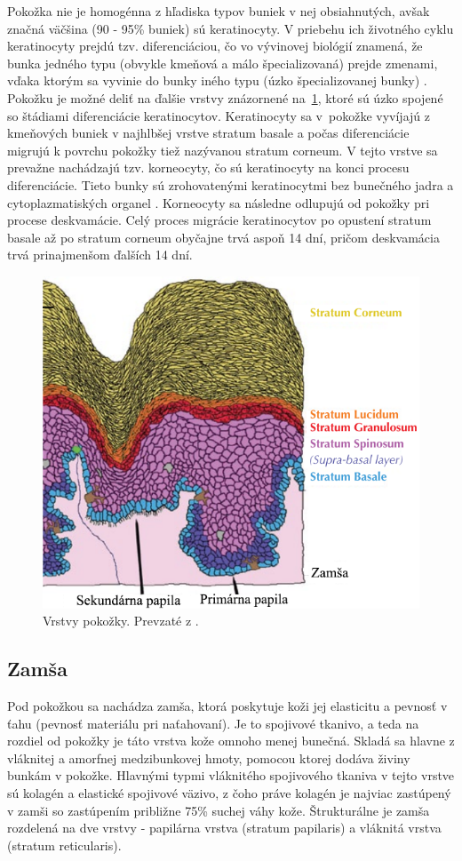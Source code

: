   Pokožka nie je homogénna z hľadiska typov buniek v nej obsiahnutých, avšak značná väčšina (90 - 95\% buniek) sú keratinocyty. V priebehu 
  ich životného cyklu keratinocyty prejdú tzv. diferenciáciou, čo vo vývinovej biológií znamená, že bunka jedného typu (obvykle kmeňová a  málo špecializovaná)
  prejde zmenami, vďaka ktorým sa vyvinie do bunky iného typu (úzko špecializovanej bunky) \cite{slack2012biology}. Pokožku je možné deliť na ďalšie
  vrstvy znázornené na~{\ref{obr:pokozka_vrstvy}}, ktoré sú úzko spojené so štádiami diferenciácie keratinocytov. Keratinocyty sa v~pokožke vyvíjajú
  z kmeňových buniek v najhlbšej vrstve stratum basale a počas diferenciácie migrujú k povrchu pokožky tiež nazývanou stratum corneum. V tejto vrstve sa 
  prevažne nachádzajú tzv. korneocyty, čo sú keratinocyty na konci procesu diferenciácie. Tieto bunky sú zrohovatenými keratinocytmi bez bunečného jadra
  a cytoplazmatiských organel \cite{koster2009epidermis}. Korneocyty sa následne odlupujú od pokožky pri procese deskvamácie. Celý proces migrácie
  keratinocytov po opustení stratum basale až po stratum corneum obyčajne trvá aspoň 14 dní, pričom deskvamácia trvá prinajmenšom ďalších 14 dní.

  \begin{figure}[h]
    \centering
    \includegraphics[width=0.65\linewidth]{obrazky-figures/pokozka_vrstvy.png}
    \caption{Vrstvy pokožky. Prevzaté z \cite{FingerprintSrcBook}.}
    \label{obr:pokozka_vrstvy}
  \end{figure}

  \subsection{Zamša}
  Pod pokožkou sa nachádza zamša, ktorá poskytuje koži jej elasticitu a pevnosť v ťahu (pevnosť materiálu pri naťahovaní). Je to spojivové tkanivo,
  a teda na rozdiel od pokožky je táto vrstva kože omnoho menej bunečná. Skladá sa hlavne z vláknitej a amorfnej medzibunkovej hmoty, pomocou ktorej dodáva
  živiny bunkám v pokožke. Hlavnými typmi vláknitého spojivového tkaniva v tejto vrstve sú kolagén a elastické spojivové väzivo, z čoho práve kolagén je
  najviac zastúpený v zamši so zastúpením približne 75\% suchej váhy kože. Štrukturálne je zamša rozdelená na dve vrstvy - papilárna vrstva (stratum papilaris)
  a vláknitá vrstva (stratum reticularis).

